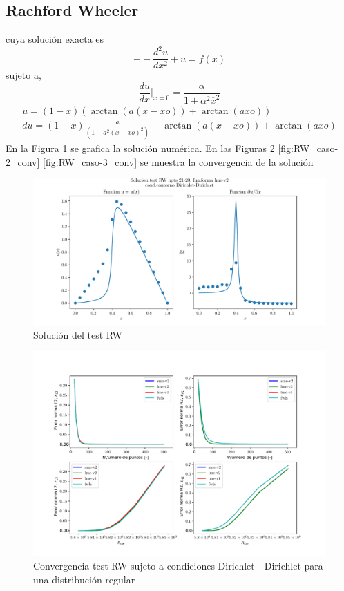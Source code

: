 \subsection{Rachford Wheeler}
cuya solución exacta es
\begin{equation}
    --\frac{d^2u}{dx^2} + u = f(x) 
\end{equation}
sujeto a,
\begin{equation}
    \frac{du}{dx}|_{x=0} = \frac{\alpha}{1+\alpha^2 \overline{x}^2} 
\end{equation}
\begin{eqnarray}
    u  = ( 1-x ) (\arctan(a(x-xo))+\arctan(a xo)) \\
    du = ( 1-x ) \frac{a}{( 1 + a^2 (x-xo)^2 )} - \arctan(a (x-xo)) + \arctan(a xo)
\end{eqnarray}
En la Figura \ref{fig:RW_caso-1_sol} se grafica la solución numérica. En las Figuras \ref{fig:RW_caso-1_conv} \ref{fig:RW_caso-2_conv} \ref{fig:RW_caso-3_conv} se muestra la convergencia de la solución
\begin{figure}
    \centering
    \includegraphics[width=1\textwidth]{./Imagenes/06/solucion/RW_21-20_regular_type-2_caso-1_lme-v2_direct_dgesv-lapack-blas.pdf}
    \caption{Solución del test RW} \label{fig:RW_caso-1_sol}
\end{figure}
\begin{figure}
    \centering
    \includegraphics[width=1\textwidth]{./Imagenes/06/comparacion_shp_regular/RW_regular_type-2_caso-1_direct_dgesv-lapack-blas_sme-v2_lme-v2_lme-v1_fwls.pdf}
    \caption{Convergencia test RW sujeto a condiciones Dirichlet - Dirichlet para una distribución regular} \label{fig:RW_caso-1_conv}
\end{figure}
